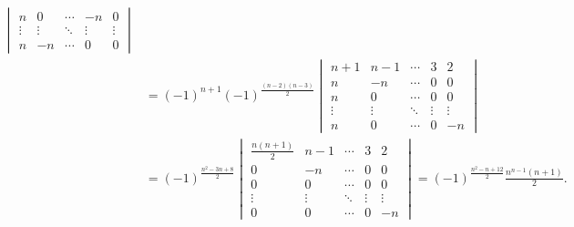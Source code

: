 \begin{exercise}
\begin{exgroup}
\begin{answer}
\begin{enumerate}
\begin{enumerate}
\begin{align*}
\begin{vmatrix}
                                                       n      & 0      & \cdots & -n     & 0      \\
                                                       \vdots & \vdots & \ddots & \vdots & \vdots \\
                                                       n      & -n     & \cdots & 0      & 0
                                                   \end{vmatrix}                                   \\
                                      & =(-1)^{n+1}(-1)^{\frac{(n-2)(n-3)}{2}}
                                    \begin{vmatrix}
                                        n+1    & n-1    & \cdots & 3      & 2      \\
                                        n      & -n     & \cdots & 0      & 0      \\
                                        n      & 0      & \cdots & 0      & 0      \\
                                        \vdots & \vdots & \ddots & \vdots & \vdots \\
                                        n      & 0      & \cdots & 0      & -n
                                    \end{vmatrix}                                                  \\
                                      & =(-1)^{\frac{n^2-3n+8}{2}}\begin{vmatrix}
                                                                      \frac{n(n+1)}{2} & n-1    & \cdots & 3      & 2      \\
                                                                      0                & -n     & \cdots & 0      & 0      \\
                                                                      0                & 0      & \cdots & 0      & 0      \\
                                                                      \vdots           & \vdots & \ddots & \vdots & \vdots \\
                                                                      0                & 0      & \cdots & 0      & -n
                                                                  \end{vmatrix}=(-1)^{\frac{n^2-n+12}{2}}\frac{n^{n-1}(n+1)}{2}.
                                \end{align*}


\end{enumerate}
\end{enumerate}
\end{answer}
\end{exgroup}
\end{exercise}
